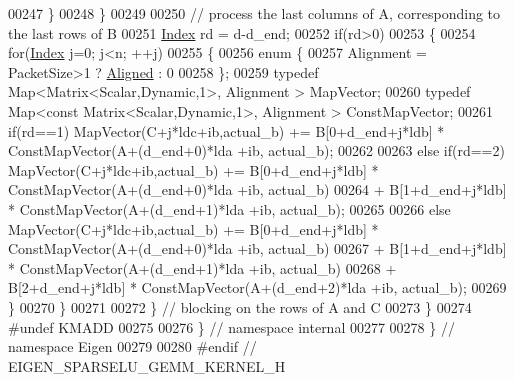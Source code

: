 \begin{DoxyCode}
00247       \}
00248     \}
00249     
00250     \textcolor{comment}{// process the last columns of A, corresponding to the last rows of B}
00251     \hyperlink{namespace_eigen_a62e77e0933482dafde8fe197d9a2cfde}{Index} rd = d-d\_end;
00252     \textcolor{keywordflow}{if}(rd>0)
00253     \{
00254       \textcolor{keywordflow}{for}(\hyperlink{namespace_eigen_a62e77e0933482dafde8fe197d9a2cfde}{Index} j=0; j<n; ++j)
00255       \{
00256         \textcolor{keyword}{enum} \{
00257           Alignment = PacketSize>1 ? \hyperlink{group__enums_gga45fe06e29902b7a2773de05ba27b47a1ad37d4c71425bb286e9b4103830538fbf}{Aligned} : 0
00258         \};
00259         \textcolor{keyword}{typedef} Map<Matrix<Scalar,Dynamic,1>, Alignment > MapVector;
00260         \textcolor{keyword}{typedef} Map<const Matrix<Scalar,Dynamic,1>, Alignment > ConstMapVector;
00261         \textcolor{keywordflow}{if}(rd==1)       MapVector(C+j*ldc+ib,actual\_b) += B[0+d\_end+j*ldb] * ConstMapVector(A+(d\_end+0)*lda
      +ib, actual\_b);
00262         
00263         \textcolor{keywordflow}{else} \textcolor{keywordflow}{if}(rd==2)  MapVector(C+j*ldc+ib,actual\_b) += B[0+d\_end+j*ldb] * ConstMapVector(A+(d\_end+0)*lda
      +ib, actual\_b)
00264                                                         + B[1+d\_end+j*ldb] * ConstMapVector(A+(d\_end+1)*lda
      +ib, actual\_b);
00265         
00266         \textcolor{keywordflow}{else}            MapVector(C+j*ldc+ib,actual\_b) += B[0+d\_end+j*ldb] * ConstMapVector(A+(d\_end+0)*lda
      +ib, actual\_b)
00267                                                         + B[1+d\_end+j*ldb] * ConstMapVector(A+(d\_end+1)*lda
      +ib, actual\_b)
00268                                                         + B[2+d\_end+j*ldb] * ConstMapVector(A+(d\_end+2)*lda
      +ib, actual\_b);
00269       \}
00270     \}
00271   
00272   \} \textcolor{comment}{// blocking on the rows of A and C}
00273 \}
00274 \textcolor{preprocessor}{#undef KMADD}
00275 
00276 \} \textcolor{comment}{// namespace internal}
00277 
00278 \} \textcolor{comment}{// namespace Eigen}
00279 
00280 \textcolor{preprocessor}{#endif // EIGEN\_SPARSELU\_GEMM\_KERNEL\_H}
\end{DoxyCode}
